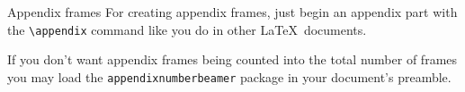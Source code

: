 \documentclass[11pt]{beamer}
\begin{document}
	
	\appendix
	
	
	\begin{frame}[fragile]{Appendix frames}
		For creating appendix frames, just begin an appendix part with the \verb|\appendix| command like you do in other \LaTeX\ documents.
		
		\medskip
		If you don't want appendix frames being counted into the total number of frames you may load the \texttt{appendixnumberbeamer} package in your document's preamble.
	\end{frame}
\end{document}
